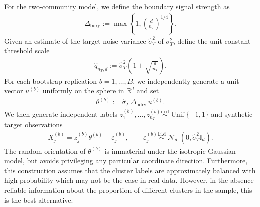 \documentclass[10pt]{article}
\newcommand{\R}{\mathbb R}
\newcommand{\simiid}{\overset{\mathrm{i.i.d}}{\sim}}
\newcommand{\Id}{\mathbb I}
\newcommand{\wh}{\widehat}
\DeclareMathOperator{\dnorm}{\mathcal N}
\newcommand{\trg}{T}
\newcommand{\nT}{n_{\trg}}
\newcommand{\sigmaT}{\sigma_{\trg}}
\begin{document}
For the two-community model, we define the boundary signal strength as
\begin{align}
\label{eq:bootstrap_boundary_signal}
\Delta_{\mathrm{bdry}}:=\max\left\{1,\left(\frac{d}{\nT}\right)^{1/4}\right\}.
\end{align}
Given an estimate of the target noise variance $\wh{\sigma}^2_T$ of $\sigmaT^2$, define the unit-constant threshold scale
\begin{align}
\label{eq:bootstrap_threshold_scale}
\wh q_{\nT,d}:=\wh\sigma^2_T\left(1+\sqrt{\frac{d}{\nT}}\right).
\end{align}
For each bootstrap replication $b=1,\ldots,B$, we independently generate a unit vector $u^{(b)}$ uniformly on the sphere in $\R^d$ and set
\begin{align}
\theta^{(b)}:=\wh\sigma_T\,\Delta_{\mathrm{bdry}}\,u^{(b)}.
\end{align}
We then generate independent labels
$z_1^{(b)},\ldots,z_{\nT}^{(b)}\simiid\operatorname{Unif}\{-1,1\}$ and
synthetic target observations
\begin{align}
\label{eq:bootstrap_synthetic_data}
X_j^{(b)}=z_j^{(b)}\theta^{(b)}+\varepsilon_j^{(b)},\qquad \varepsilon_j^{(b)}\simiid \dnorm_d(0,\wh\sigma^2_T\Id_d).
\end{align}
The random orientation of $\theta^{(b)}$ is immaterial under the isotropic Gaussian model, but avoids privileging any particular coordinate direction. Furthermore, this construction assumes that the cluster labels are approximately balanced with high probability which may not be the case in real data. However, in the absence reliable information about the proportion of different clusters in the sample, this is the best alternative.
\end{document}
